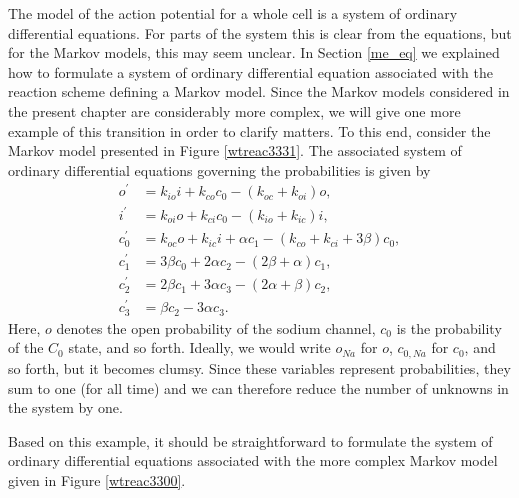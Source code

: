 The model of the action potential for a whole cell is a system of ordinary differential equations. For parts of the system this is clear from the equations,
but for the Markov models, this may seem unclear. In Section \ref{me_eq} we explained how to formulate a system of ordinary differential equation associated with the reaction scheme defining a Markov model.  Since the Markov models considered in the present chapter are considerably more complex, we will give one more example of this transition in order to clarify matters. To this end, consider the Markov model presented in Figure \ref{wtreac3331}. 
 The associated system of ordinary differential equations governing the probabilities is given by
\begin{align*}
o^{\prime}  & =k_{io}i+k_{co}c_{0}-\left(  k_{oc}+k_{oi}\right)  o,\\
i^{\prime}  & =k_{oi}o+k_{ci}c_{0}-\left(  k_{io}+k_{ic}\right)  i,\\
c_{0}^{\prime}  & =k_{oc}o+k_{ic}i+\alpha c_{1}-\left(  k_{co}+k_{ci}%
+3\beta\right)  c_{0},\\
c_{1}^{\prime}  & =3\beta c_{0}+2\alpha c_{2}-\left(  2\beta+\alpha\right)
c_{1},\\
c_{2}^{\prime}  & =2\beta c_{1}+3\alpha c_{3}-\left(  2\alpha+\beta\right)
c_{2},\\
c_{3}^{\prime}  & =\beta c_{2}-3\alpha c_{3}.%
\end{align*}
Here, $o$ denotes the open probability of the sodium channel,  $c_0$ is the probability of the $C_0$ state, and so forth. Ideally, we would write $o_{Na}$ for $o$, $c_{0,Na}$ for $c_0$, and so forth, but it becomes clumsy. Since these variables represent probabilities, they sum to one (for all time) and we can therefore reduce the number of unknowns in the system by one.

Based on this example, it should be straightforward to formulate the system of ordinary differential equations associated with the more complex Markov model given in Figure \ref{wtreac3300}.

